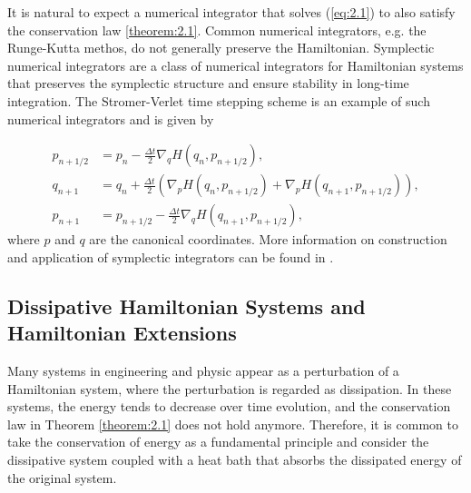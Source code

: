 It is natural to expect a numerical integrator that solves (\ref{eq:2.1}) to also satisfy the conservation law \ref{theorem:2.1}. Common numerical integrators, e.g. the Runge-Kutta methos, do not generally preserve the Hamiltonian. Symplectic numerical integrators are a class of numerical integrators for Hamiltonian systems that preserves the symplectic structure and ensure stability in long-time integration. The Str\:omer-Verlet time stepping scheme is an example of such numerical integrators and is given by

\begin{equation} \label{eq:2.3}
\begin{aligned}
	p_{n+1/2} &= p_n - \frac{\Delta t}{2} \nabla_qH(q_{n},p_{n+1/2}), \\
	q_{n+1} &= q_n + \frac{\Delta t}{2} \left( \nabla_pH(q_{n},p_{n+1/2}) + \nabla_pH(q_{n+1},p_{n+1/2}) \right),\\
	p_{n+1} &= p_{n+1/2} - \frac{\Delta t}{2} \nabla_qH(q_{n+1},p_{n+1/2}),
\end{aligned}
\end{equation}
where $p$ and $q$ are the canonical coordinates. More information on construction and application of symplectic integrators can be found in \cite{Hairer:1250576}.

\subsection{Dissipative Hamiltonian Systems and Hamiltonian Extensions}

Many systems in engineering and physic appear as a perturbation of a Hamiltonian system, where the perturbation is regarded as dissipation. In these systems, the energy tends to decrease over time evolution, and the conservation law in Theorem \ref{theorem:2.1} does not hold anymore. Therefore, it is common to take the conservation of energy as a fundamental principle and consider the dissipative system coupled with a heat bath that absorbs the dissipated energy of the original system. 

